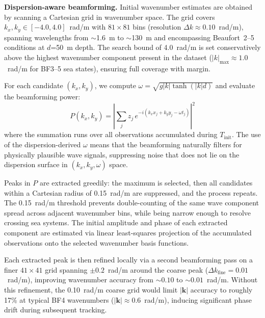 \documentclass[review]{elsarticle}
\begin{document}
\textbf{Dispersion-aware beamforming.}
Initial wavenumber estimates are obtained by scanning a Cartesian
grid in wavenumber space.  The grid covers
$k_x, k_y \in [-4.0, 4.0]$~rad/m with $81 \times 81$ bins
(resolution $\Delta k \approx 0.10$~rad/m), spanning wavelengths
from $\sim$1.6~m to $\sim$130~m and encompassing Beaufort~2--5
conditions at $d$=50~m depth.  The search bound of 4.0~rad/m
is set conservatively above the highest wavenumber component
present in the dataset ($|k|_\text{max} \approx 1.0$~rad/m for
BF3--5 sea states), ensuring full coverage with margin.

For each candidate $(k_x, k_y)$, we compute
$\omega = \sqrt{g|k|\tanh(|k|d)}$ and evaluate the beamforming power:
\begin{equation}
  P(k_x, k_y) = \left| \sum_{j} z_j \, e^{-i(k_x x_j + k_y y_j - \omega t_j)} \right|^2
\end{equation}
where the summation runs over all observations accumulated during
$T_\text{init}$.  The use of the dispersion-derived $\omega$ means
that the beamforming naturally filters for physically plausible
wave signals, suppressing noise that does not lie on the
dispersion surface in $(k_x, k_y, \omega)$ space.

Peaks in $P$ are extracted greedily: the maximum is selected, then
all candidates within a Cartesian radius of 0.15~rad/m are
suppressed, and the process repeats.  The 0.15~rad/m threshold
prevents double-counting of the same wave component spread across
adjacent wavenumber bins, while being narrow enough to resolve
crossing sea systems.  The initial amplitude and phase of each extracted component
are estimated via linear least-squares projection of the accumulated
observations onto the selected wavenumber basis functions.

Each extracted peak is then refined locally via a second beamforming
pass on a finer $41\times41$ grid spanning $\pm0.2$~rad/m around
the coarse peak ($\Delta k_{\text{fine}} = 0.01$~rad/m), improving
wavenumber accuracy from $\sim0.10$ to $\sim0.01$~rad/m. Without
this refinement, the 0.10~rad/m coarse grid would limit $|\mathbf{k}|$
accuracy to roughly 17\% at typical BF4 wavenumbers
($|\mathbf{k}| \approx 0.6$~rad/m), inducing significant phase
drift during subsequent tracking.
\end{document}
